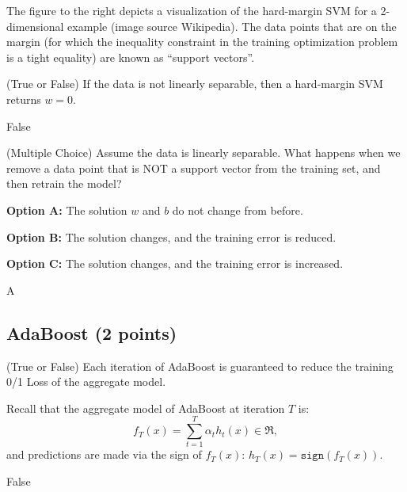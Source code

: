 The figure to the right depicts a visualization of the hard-margin SVM for a 2-dimensional example (image source Wikipedia).  The data points that are on the margin (for which the inequality constraint in the training optimization problem is a tight equality) are known as ``support vectors''.


\question (True or False) If the data is not linearly separable, then a hard-margin SVM returns $w=0$.  

\begin{solution}
False
\end{solution}


\smallskip 



\question (Multiple Choice) Assume the data is linearly separable. What happens when we remove a data point that is NOT a support vector from the training set, and then retrain the model?

\smallskip

\textbf{Option A:} The solution $w$ and $b$ do not change from before.
\smallskip

\textbf{Option B:} The solution changes, and the training error is reduced.
\smallskip

\textbf{Option C:} The solution changes, and the training error is increased.
\smallskip

\vspace{-0.1in}
\begin{solution}
A
\end{solution}

\subsection{AdaBoost (2 points)}
\question (True or False)  Each iteration of AdaBoost is guaranteed to reduce the training 0/1 Loss of the aggregate model. 

Recall that the aggregate model of AdaBoost at iteration $T$ is:
$$f_T(x) = \sum_{t=1}^T \alpha_t h_t(x)\in\Re,$$
and predictions are made via the sign of $f_T(x)$: $h_T(x) = \texttt{sign}(f_T(x))$.  %


\vspace{-0.1in}
\begin{solution}
False
\end{solution}

\smallskip

